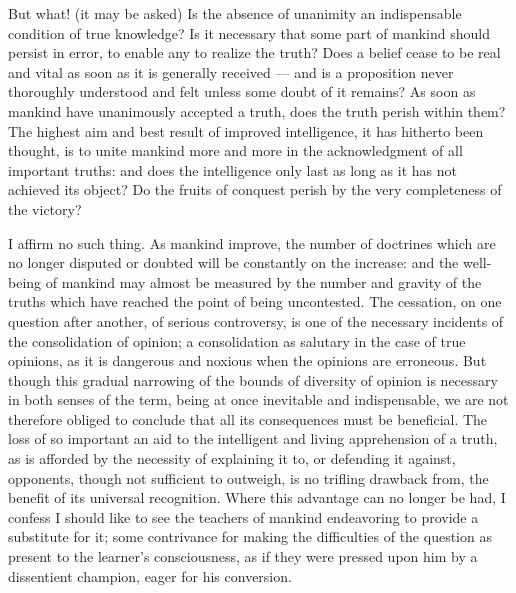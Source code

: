 \documentclass[12pt]{report}
\begin{document}
But what! (it may be asked) Is the absence of unanimity an indispensable condition of true knowledge? Is it necessary that some part of mankind should persist in error, to enable any to realize the truth? Does a belief cease to be real and vital as soon as it is generally received — and is a proposition never thoroughly understood and felt unless some doubt of it remains? As soon as mankind have unanimously accepted a truth, does the truth perish within them? The highest aim and best result of improved intelligence, it has hitherto been thought, is to unite mankind more and more in the acknowledgment of all important truths: and does the intelligence only last as long as it has not achieved its object? Do the fruits of conquest perish by the very completeness of the victory?

I affirm no such thing. As mankind improve, the number of doctrines which are no longer disputed or doubted will be constantly on the increase: and the well-being of mankind may almost be measured by the number and gravity of the truths which have reached the point of being uncontested. The cessation, on one question after another, of serious controversy, is one of the necessary incidents of the consolidation of opinion; a consolidation as salutary in the case of true opinions, as it is dangerous and noxious when the opinions are erroneous. But though this gradual narrowing of the bounds of diversity of opinion is necessary in both senses of the term, being at once inevitable and indispensable, we are not therefore obliged to conclude that all its consequences must be beneficial. The loss of so important an aid to the intelligent and living apprehension of a truth, as is afforded by the necessity of explaining it to, or defending it against, opponents, though not sufficient to outweigh, is no trifling drawback from, the benefit of its universal recognition. Where this advantage can no longer be had, I confess I should like to see the teachers of mankind endeavoring to provide a substitute for it; some contrivance for making the difficulties of the question as present to the learner's consciousness, as if they were pressed upon him by a dissentient champion, eager for his conversion.
\end{document}
